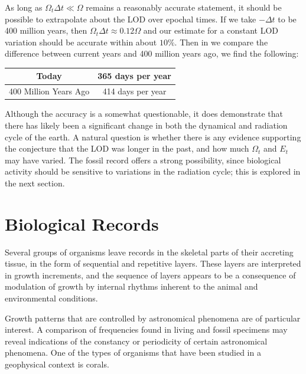 \documentclass[11pt]{article}
\begin{document}
As long as $\Omega_t \Delta t \ll \Omega$ remains a reasonably accurate statement, it should be possible to extrapolate about the LOD over epochal times. If we take $-\Delta t$ to be 400 million years, then $\Omega_t \Delta t \approx 0.12 \Omega$ and our estimate for a constant LOD variation should be accurate within about $10\%$. Then in we compare the difference between current years and 400 million years ago, we find the following:
\begin{center}
\begin{tabular}{|c|c|}
\hline
        Today         & 365 days per year \\
\hline
400 Million Years Ago & 414 days per year \\
\hline
\end{tabular}
\end{center}
Although the accuracy is a somewhat questionable, it does demonstrate that there has likely been a significant change in both the dynamical and radiation cycle of the earth. A natural question is whether there is any evidence supporting the conjecture that the LOD was longer in the past, and how much $\Omega_t$ and $E_t$ may have varied. The fossil record offers a strong possibility, since biological activity should be sensitive to variations in the radiation cycle; this is explored in the next section.


\section{Biological Records}
\label{BioRecords}


Several groups of organisms leave records in the skeletal parts of their accreting tissue, in the form of sequential and repetitive layers. These layers are interpreted in growth increments, and the sequence of layers appears to be a consequence of modulation of growth by internal rhythms inherent to the animal and environmental conditions.

Growth patterns that are controlled by astronomical phenomena are of particular interest. A comparison of frequencies found in living and fossil specimens may reveal indications of the constancy or periodicity of certain astronomical phenomena. One of the types of organisms that have been studied in a geophysical context is corals.
\end{document}
